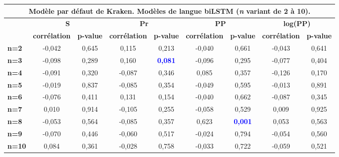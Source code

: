 \documentclass[10pt,twoside]{article}
\begin{document}
\begin{table}
\begin{center}
\begin{scriptsize}
\begin{tabular}{|l|c|c|c|c|c|c|c|c|}
    \end{tabular}
    \begin{tabular}{|l|c|c|c|c|c|c|c|c|}
    \multicolumn{9}{c}{{\footnotesize Modèle par défaut de Kraken. Modèles de langue biLSTM (\textit{n} variant de 2 à 10).}}\\\hline
    \multirow{2}{*}{\textbf{}} & \multicolumn{2}{c|}{\textbf{S}}         & \multicolumn{2}{c|}{\textbf{Pr}}        & \multicolumn{2}{c|}{\textbf{PP}}        & \multicolumn{2}{c|}{\textbf{log(PP)}}   \\ \cline{2-9} 
                               & \textbf{corrélation} & \textbf{p-value} & \textbf{corrélation} & \textbf{p-value} & \textbf{corrélation} & \textbf{p-value} & \textbf{corrélation} & \textbf{p-value} \\ \hline
    \textbf{n=2}  & -0,042 & 0,645 & 0,115  & 0,213 & -0,040 & 0,661          & -0,043 & 0,641 \\ \hline
    \textbf{n=3}  & -0,098 & 0,289 & 0,160  & \textcolor{blue}{\textbf{0,081}} & -0,096 & 0,295          & -0,077 & 0,404 \\ \hline
    \textbf{n=4}  & -0,091 & 0,320 & -0,087 & 0,346 & 0,085  & 0,357          & -0,126 & 0,170 \\ \hline
    \textbf{n=5}  & -0,019 & 0,837 & -0,085 & 0,354 & -0,049 & 0,595          & -0,013 & 0,891 \\ \hline
    \textbf{n=6}  & -0,076 & 0,411 & 0,131  & 0,154 & -0,040 & 0,662          & -0,087 & 0,345 \\ \hline
    \textbf{n=7}  & 0,010  & 0,914 & -0,105 & 0,255 & -0,058 & 0,529          & 0,009  & 0,925 \\ \hline
    \textbf{n=8}  & -0,053 & 0,564 & -0,085 & 0,357 & 0,623  & \textcolor{blue}{\textbf{0,001}}        & 0,053  & 0,563 \\ \hline
    \textbf{n=9}  & -0,070 & 0,446 & -0,060 & 0,517 & -0,024 & 0,794          & -0,054 & 0,560 \\ \hline
    \textbf{n=10} & 0,084  & 0,361 & -0,028 & 0,758 & -0,033 & 0,722          & -0,059 & 0,521 \\ \hline
    




\end{tabular}
\end{scriptsize}
\end{center}
\end{table}
\end{document}
